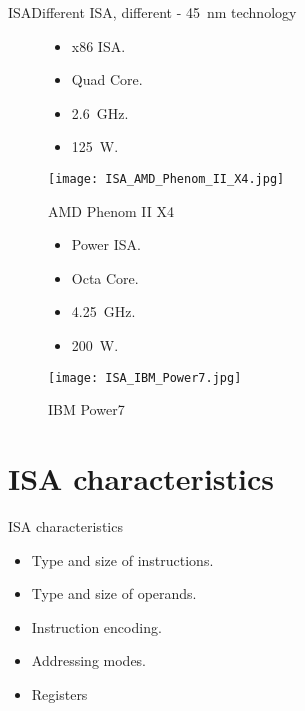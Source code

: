 \begin{frame}{\acl{ISA}}{Different \ac{ISA}, different \uA - 45~nm technology}
\begin{figure}[!htb]
  \begin{minipage}{0.5\textwidth}
    \centering
    \begin{itemize}
      \item x86 \ac{ISA}.
      \item Quad Core.
      \item 2.6~GHz.
      \item 125~W.
    \end{itemize}
    \texttt{[image: ISA\_AMD\_Phenom\_II\_X4.jpg]}
    \caption{AMD Phenom II X4}
    \label{Figure:AMD_Phenom_X4b}
  \end{minipage}%
  \begin{minipage}{0.50\textwidth}
    \centering
    \begin{itemize}
      \item Power \ac{ISA}.
      \item Octa Core.
      \item 4.25~GHz.
      \item 200~W.
    \end{itemize}
    \texttt{[image: ISA\_IBM\_Power7.jpg]}
    \caption{IBM Power7}
    \label{Figure:IBM_Power}
  \end{minipage}
\end{figure}
\end{frame}

\section{ISA characteristics}
\begin{frame}{\acs{ISA} characteristics}{}
  \begin{itemize}
    \item Type and size of instructions.
    \item Type and size of operands.
    \item Instruction encoding.
    \item Addressing modes.    
    \item Registers
  \end{itemize}
\end{frame}

